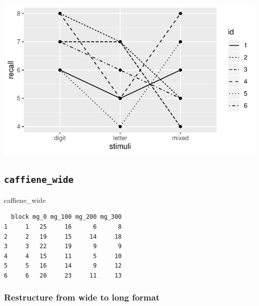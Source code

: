 \documentclass[
]{article}
\newenvironment{Shaded}{\begin{snugshade}}{\end{snugshade}}
\newcommand{\NormalTok}[1]{#1}
\begin{document}
\begin{center}\includegraphics{Chapter-15-Assignment-R-Skeleton--2020spring_files/figure-latex/unnamed-chunk-3-1} \end{center}

\clearpage

\hypertarget{caffiene_wide}{%
\subsection{\texorpdfstring{\texttt{caffiene\_wide}}{caffiene\_wide}}\label{caffiene_wide}}

\begin{Shaded}
\begin{Highlighting}[]
\NormalTok{caffiene_wide}
\end{Highlighting}
\end{Shaded}

\begin{verbatim}
  block mg_0 mg_100 mg_200 mg_300
1     1   25     16      6      8
2     2   19     15     14     18
3     3   22     19      9      9
4     4   15     11      5     10
5     5   16     14      9     12
6     6   20     23     11     13
\end{verbatim}

\hypertarget{restructure-from-wide-to-long-format-1}{%
\subsubsection{Restructure from wide to long
format}\label{restructure-from-wide-to-long-format-1}}
\end{document}
